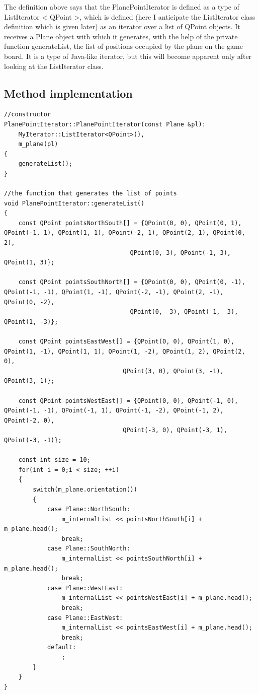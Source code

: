 \documentclass{article}
\begin{document}
The definition above says that the PlanePointIterator is defined as a type of ListIterator < QPoint >, which is defined (here I anticipate the ListIterator class definition which is given later) as an iterator over a list of QPoint objects. It receives a Plane object with which it generates, with the help of the private function generateList, the list of positions occupied by the plane on the game board. It is a type of Java-like iterator, but this will become apparent only after looking at the ListIterator class. 

\subsection {Method implementation}
\begin{lstlisting}
//constructor
PlanePointIterator::PlanePointIterator(const Plane &pl):
    MyIterator::ListIterator<QPoint>(),
    m_plane(pl)
{
    generateList();
}

//the function that generates the list of points
void PlanePointIterator::generateList()
{
    const QPoint pointsNorthSouth[] = {QPoint(0, 0), QPoint(0, 1), QPoint(-1, 1), QPoint(1, 1), QPoint(-2, 1), QPoint(2, 1), QPoint(0, 2),
                                   QPoint(0, 3), QPoint(-1, 3), QPoint(1, 3)};

    const QPoint pointsSouthNorth[] = {QPoint(0, 0), QPoint(0, -1), QPoint(-1, -1), QPoint(1, -1), QPoint(-2, -1), QPoint(2, -1), QPoint(0, -2),
                                   QPoint(0, -3), QPoint(-1, -3), QPoint(1, -3)};

    const QPoint pointsEastWest[] = {QPoint(0, 0), QPoint(1, 0), QPoint(1, -1), QPoint(1, 1), QPoint(1, -2), QPoint(1, 2), QPoint(2, 0),
                                 QPoint(3, 0), QPoint(3, -1), QPoint(3, 1)};

    const QPoint pointsWestEast[] = {QPoint(0, 0), QPoint(-1, 0), QPoint(-1, -1), QPoint(-1, 1), QPoint(-1, -2), QPoint(-1, 2), QPoint(-2, 0),
                                 QPoint(-3, 0), QPoint(-3, 1), QPoint(-3, -1)};

    const int size = 10;
    for(int i = 0;i < size; ++i)
    {
        switch(m_plane.orientation())
        {
            case Plane::NorthSouth:
                m_internalList << pointsNorthSouth[i] + m_plane.head();
                break;
            case Plane::SouthNorth:
                m_internalList << pointsSouthNorth[i] + m_plane.head();
                break;
            case Plane::WestEast:
                m_internalList << pointsWestEast[i] + m_plane.head();
                break;
            case Plane::EastWest:
                m_internalList << pointsEastWest[i] + m_plane.head();
                break;
            default:
                ;
        }
    }
}

\end{lstlisting}
\end{document}
